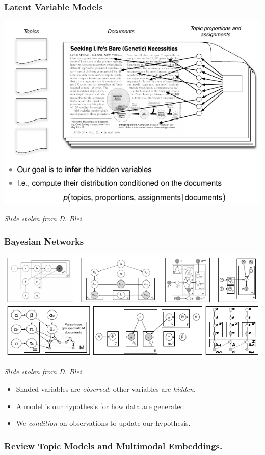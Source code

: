 \documentclass{beamer}
\begin{document}
\begin{frame}
  \frametitle{Latent Variable Models}
  {\centering \includegraphics[width=\textwidth]{assets/lda_hidden.pdf}}
  {\small \emph{Slide stolen from D. Blei.} \par}
\end{frame}

\begin{frame}
  \frametitle{Bayesian Networks}
  {\centering \includegraphics[width=\textwidth]{assets/lda_crazy.pdf}}
  {\small \emph{Slide stolen from D. Blei.} \par}
  \begin{itemize}
  \item Shaded variables are \emph{observed}, other variables are \emph{hidden}.
  \item A model is our hypothesis for how data are generated.
  \item We \emph{condition} on observations to update our hypothesis.
  \end{itemize}
\end{frame}

\begin{frame}
  \frametitle{Review Topic Models and Multimodal Embeddings.}
\end{frame}
\end{document}
